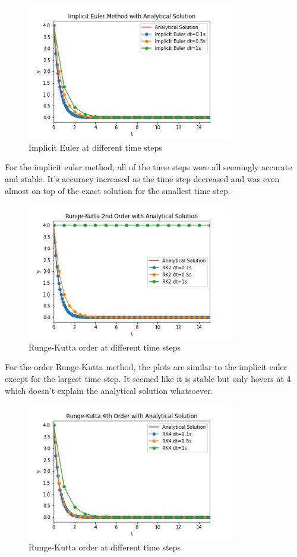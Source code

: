 \documentclass{article}
\begin{document}
		\begin{figure}[H]
			\centering
			\includegraphics[width=0.8\textwidth]{images/imp1a.jpg}
			\caption{\label{} Implicit Euler at different time steps}
		\end{figure}
		For the implicit euler method, all of the time steps were all seemingly accurate and stable. It's accuracy increased as the time step decreased and was even almost on top of the exact solution for the smallest time step. 
		\begin{figure}[H]
			\centering
			\includegraphics[width=0.8\textwidth]{images/rk21a.jpg}
			\caption{\label{} Runge-Kutta  order at different time steps}
		\end{figure}
		For the  order Runge-Kutta method, the plots are similar to the implicit euler except for the largest time step. It seemed like it is stable but only hovers at 4 which doesn't explain the analytical solution whatsoever. 
		\begin{figure}[H]
			\centering
			\includegraphics[width=0.8\textwidth]{images/rk41a.jpg}
			\caption{\label{} Runge-Kutta  order at different time steps}
		\end{figure}
\end{document}
